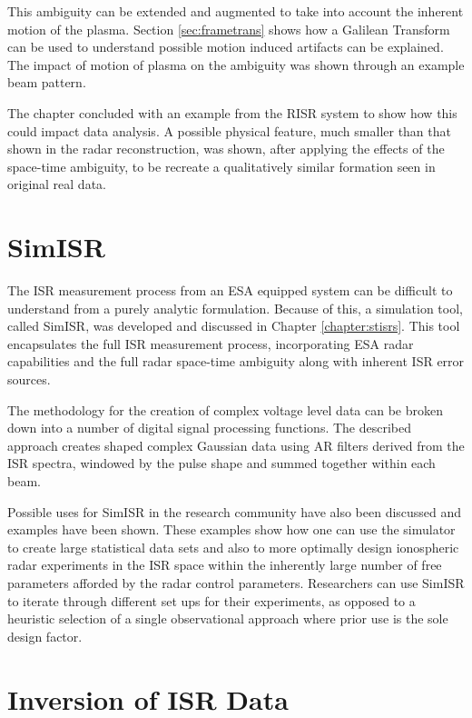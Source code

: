 This ambiguity can be extended and augmented to take into account the inherent motion of the plasma. Section \ref{sec:frametrans} shows how a Galilean Transform can be used to understand possible motion induced artifacts can be explained. The impact of motion of plasma on the ambiguity was shown through an example beam pattern.

The chapter concluded with an example from the RISR system to show how this could impact data analysis. A possible physical feature, much smaller than that shown in the radar reconstruction, was shown, after applying the effects of the space-time ambiguity, to be recreate a qualitatively similar formation seen in original real data. 
  
\section{SimISR}


The ISR measurement process from an ESA equipped system can be difficult to understand from a purely analytic formulation. Because of this, a simulation tool, called SimISR, was developed and discussed in Chapter \ref{chapter:stisrs}. This tool encapsulates the full ISR measurement process, incorporating ESA radar capabilities and the full radar space-time ambiguity along with inherent ISR error sources. 

The methodology for the creation of complex voltage level data can be broken down into a number of digital signal processing functions. The described approach creates shaped complex Gaussian data using AR filters derived from the ISR spectra, windowed by the pulse shape and summed together within each beam.  

Possible uses for SimISR in the research community have also been discussed and examples have been shown. These examples show how one can use the simulator to create large statistical data sets and also to more optimally design ionospheric radar experiments in the ISR space within the inherently large number of free parameters afforded by the radar control parameters. Researchers can use SimISR to iterate through different set ups for their experiments, as opposed to a heuristic selection of a single observational approach where prior use is the sole design factor. 
 
\section{Inversion of ISR Data}


